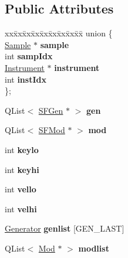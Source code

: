 \subsection*{Public Attributes}
\begin{DoxyCompactItemize}
\item 
\mbox{\label{class_fluid_s_1_1_zone_a64d938df5b47fcf78c11f5e2556fe683}} 
\begin{tabbing}
xx\=xx\=xx\=xx\=xx\=xx\=xx\=xx\=xx\=\kill
union \{\\
\>\hyperlink{class_fluid_s_1_1_sample}{Sample} $\ast$ {\bfseries sample}\\
\>int {\bfseries sampIdx}\\
\>\hyperlink{class_fluid_s_1_1_instrument}{Instrument} $\ast$ {\bfseries instrument}\\
\>int {\bfseries instIdx}\\
\}; \\

\end{tabbing}\item 
\mbox{\label{class_fluid_s_1_1_zone_a3164d37bebc9622bfb70abb8f2717652}} 
Q\+List$<$ \hyperlink{struct_fluid_s_1_1_s_f_gen}{S\+F\+Gen} $\ast$ $>$ {\bfseries gen}
\item 
\mbox{\label{class_fluid_s_1_1_zone_a176f46449b914b3487855e7596a2ac77}} 
Q\+List$<$ \hyperlink{struct_fluid_s_1_1_s_f_mod}{S\+F\+Mod} $\ast$ $>$ {\bfseries mod}
\item 
\mbox{\label{class_fluid_s_1_1_zone_aa9aa615a4a73a3c05ef0a6768763156b}} 
int {\bfseries keylo}
\item 
\mbox{\label{class_fluid_s_1_1_zone_a54bad548a3d453c7e45c1983a9dbcaef}} 
int {\bfseries keyhi}
\item 
\mbox{\label{class_fluid_s_1_1_zone_aaa1a4e5e75c7c1008fc81035191a41d0}} 
int {\bfseries vello}
\item 
\mbox{\label{class_fluid_s_1_1_zone_a6862b8cfa38676b0274e60163e984513}} 
int {\bfseries velhi}
\item 
\mbox{\label{class_fluid_s_1_1_zone_ae82335be3e7394fe72da8a2abb39ae49}} 
\hyperlink{class_fluid_s_1_1_generator}{Generator} {\bfseries genlist} \mbox{[}G\+E\+N\+\_\+\+L\+A\+ST\mbox{]}
\item 
\mbox{\label{class_fluid_s_1_1_zone_a7b0aabb8aed86a59d98a6f3d9f384d29}} 
Q\+List$<$ \hyperlink{struct_fluid_s_1_1_mod}{Mod} $\ast$ $>$ {\bfseries modlist}
\end{DoxyCompactItemize}



